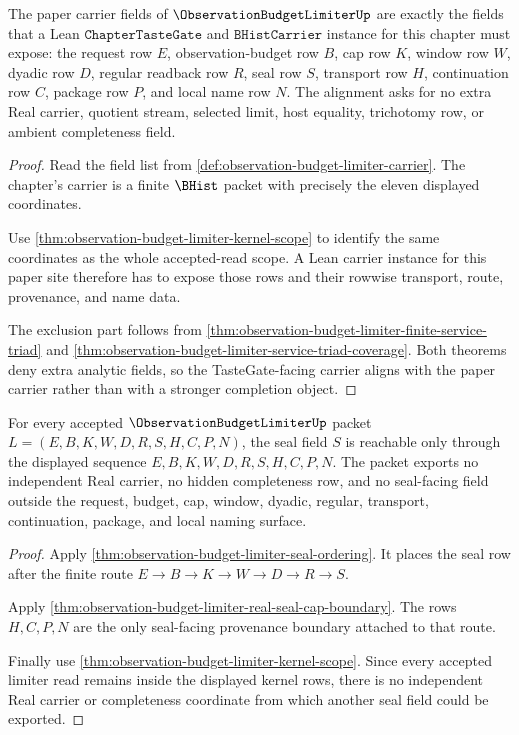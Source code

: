 \begin{theorem}
\label{thm:observation-budget-limiter-taste-gate-carrier-alignment}
The paper carrier fields of $\ObservationBudgetLimiterUp$ are exactly the fields that a Lean $\texttt{ChapterTasteGate}$ and $\texttt{BHistCarrier}$ instance for this chapter must expose: the request row $E$, observation-budget row $B$, cap row $K$, window row $W$, dyadic row $D$, regular readback row $R$, seal row $S$, transport row $H$, continuation row $C$, package row $P$, and local name row $N$. The alignment asks for no extra Real carrier, quotient stream, selected limit, host equality, trichotomy row, or ambient completeness field.
\end{theorem}
\begin{proof}
Read the field list from \autoref{def:observation-budget-limiter-carrier}. The chapter's carrier is a finite $\BHist$ packet with precisely the eleven displayed coordinates.

Use \autoref{thm:observation-budget-limiter-kernel-scope} to identify the same coordinates as the whole accepted-read scope. A Lean carrier instance for this paper site therefore has to expose those rows and their rowwise transport, route, provenance, and name data.

The exclusion part follows from \autoref{thm:observation-budget-limiter-finite-service-triad} and \autoref{thm:observation-budget-limiter-service-triad-coverage}. Both theorems deny extra analytic fields, so the TasteGate-facing carrier aligns with the paper carrier rather than with a stronger completion object.
\end{proof}

\begin{theorem}
\label{thm:observation-budget-limiter-seal-field-boundary}
For every accepted $\ObservationBudgetLimiterUp$ packet $L=(E,B,K,W,D,R,S,H,C,P,N)$, the seal field $S$ is reachable only through the displayed sequence $E,B,K,W,D,R,S,H,C,P,N$. The packet exports no independent Real carrier, no hidden completeness row, and no seal-facing field outside the request, budget, cap, window, dyadic, regular, transport, continuation, package, and local naming surface.
\end{theorem}
\begin{proof}
Apply \autoref{thm:observation-budget-limiter-seal-ordering}. It places the seal row after the finite route $E \to B \to K \to W \to D \to R \to S$.

Apply \autoref{thm:observation-budget-limiter-real-seal-cap-boundary}. The rows $H,C,P,N$ are the only seal-facing provenance boundary attached to that route.

Finally use \autoref{thm:observation-budget-limiter-kernel-scope}. Since every accepted limiter read remains inside the displayed kernel rows, there is no independent Real carrier or completeness coordinate from which another seal field could be exported.
\end{proof}


